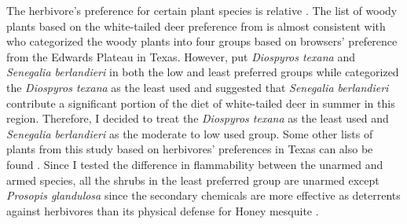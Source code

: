 \documentclass[12pt]{report}
\begin{document}
The herbivore’s preference for certain plant species is relative \citep{wright2003white}. The list of woody plants based on the white-tailed deer preference from \citep{wright2003white} is almost consistent with \citep{nelle1996management} who categorized the woody plants into four groups based on browsers’ preference from the Edwards Plateau in Texas. However,  \citep{wright2003white} put \emph{Diospyros texana} and \emph{Senegalia berlandieri} in both the low and least preferred groups while \citep{nelle1996management} categorized the \emph{Diospyros texana} as the least used and \citep*{varner1987southern} suggested that \emph{Senegalia berlandieri} contribute a significant portion of the diet of white-tailed deer in summer in this region.  Therefore, I decided to treat the \emph{Diospyros texana} as the least used and \emph{Senegalia berlandieri} as the moderate to low used group. Some other lists of plants from this study based on herbivores’ preferences in Texas can also be found \citep{arnold1979seasonallist, nelle2001ecological, everitt1974springfoodhabit, dillard2006whitetaileddeer}. Since I tested the difference in flammability between the unarmed and armed species, all the shrubs in the least preferred group are unarmed except \emph{Prosopis glandulosa} since the secondary chemicals are more effective as deterrents against herbivores than its physical defense for Honey mesquite \citep{wright2003white}.
\end{document}
